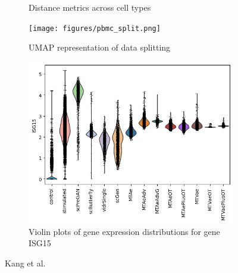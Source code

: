 \documentclass[12pt, a4paper]{article}
\begin{document}
\begin{figure}[h!]
\begin{subfigure}[t]{0.42\textwidth}
        \caption{Distance metrics across cell types}
        \label{}
    \end{subfigure}
    \begin{subfigure}[b]{0.48\textwidth}
        \centering
        \texttt{[image: figures/pbmc\_split.png]}
        \caption{UMAP representation of data splitting}
        \label{}
    \end{subfigure}
    \begin{subfigure}[b]{0.48\textwidth}
        \centering
        \includegraphics[width=.75\textwidth]{violins_pbmc.png}
        \caption{Violin plots of gene expression distributions for gene ISG15}
        \label{}
    \end{subfigure}     
    \caption{Kang et al. \cite{kanaGenerativeModelingSinglecell2023}}
    \label{fig:eval_pbmc}
\end{figure}
\end{document}
